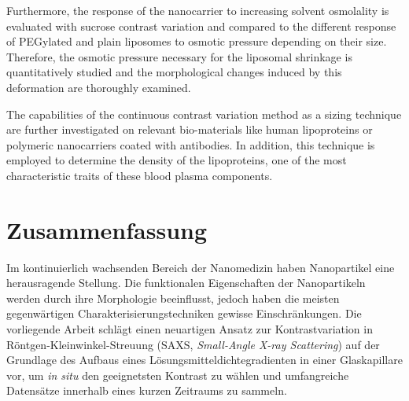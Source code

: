 Furthermore, the response of the nanocarrier to increasing solvent osmolality is evaluated with sucrose contrast variation and compared to the different response of PEGylated and plain liposomes to osmotic pressure depending on their size. Therefore, the osmotic pressure necessary for the liposomal shrinkage is quantitatively studied and the morphological changes induced by this deformation are thoroughly examined.


The capabilities of the continuous contrast variation method as a sizing technique  are further investigated on relevant bio-materials like human lipoproteins or polymeric nanocarriers coated with antibodies. In addition, this technique is employed to determine the density of the lipoproteins, one of the most characteristic traits of these blood plasma components.





\normalsize

\cleardoublepage

\thispagestyle{empty}

\chapter*{Zusammenfassung}


Im kontinuierlich wachsenden Bereich der Nanomedizin haben Nanopartikel eine herausragende Stellung. Die funktionalen Eigenschaften der Nanopartikeln werden durch ihre Morphologie beeinflusst, jedoch haben die meisten gegenwärtigen Charakterisierungstechniken gewisse Einschränkungen. Die vorliegende Arbeit schlägt einen neuartigen Ansatz zur Kontrastvariation in Röntgen-Kleinwinkel-Streuung (SAXS, \emph{Small-Angle X-ray Scattering}) auf der Grundlage des Aufbaus eines Lösungsmitteldichtegradienten in einer Glaskapillare vor, um \emph{in situ} den geeignetsten Kontrast zu wählen und umfangreiche Datensätze innerhalb eines kurzen Zeitraums zu sammeln.

